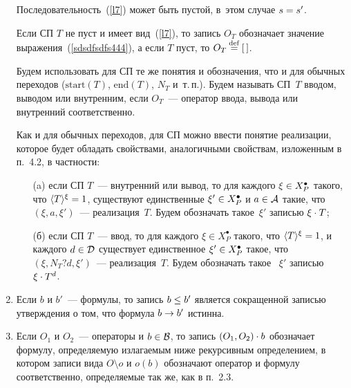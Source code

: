 \begin{multicols}{2}
\begin{enumerate}[1.]
Последовательность~(\ref{l7}) может быть пустой, в~этом случае $s\hm=s'$.

Если СП $T$ не пуст и имеет вид~(\ref{l7}), то
запись $O_T$ обозначает значение выражения~(\ref{sdsdfsdfs444}), а  если $T$ пуст,
то $O_T\mathbin{{\mathop{=}\limits^{\mathrm{def}}}} [\,]$.

Будем использовать для СП те же понятия и обозначения, что и для
обычных переходов ($\mathrm{start}\left(T\right)$,
$\mathrm{end}\left(T\right)$, $N_T$  и~т.\,п.). Будем
называть СП~$T$ вводом, выводом или внутренним, если $O_T$~---
оператор ввода, вывода или внутренний соответственно.

Как и для обычных переходов, для СП можно ввести понятие реализации,
которое будет обладать свойствами, аналогичными свойствам,
изложенным в п.~4.2, в частности:
\begin{itemize}
\item[(a)] если СП $T$~--- внутренний или вывод, то для каждого
$\xi\hm\in X_P^\bullet$ такого, что $\langle{T}\rangle^\xi\hm=1$, существуют единственные $\xi'\hm\in X_P^\bullet$ и
$a\hm\in {\cal A}$ такие, что  $(\xi, a, \xi')$~--- реализация~$T$.
Будем обозначать такое~$\xi'$  записью $\xi \cdot T$;
\item[(б)] если  СП $T$~--- ввод, то для каждого $\xi\in X_P^\bullet$
такого, что $\langle{T}\rangle^\xi \hm= 1$, и каждого $d\hm\in {\cal D}$ существует
единственное $\xi'\hm\in X_P^\bullet$ такое, что
 $(\xi, N_T?d, \xi')$~--- реализация~$T$. Будем обозначать такое~ $\xi'$
 записью $\xi \cdot T^d$.
\end{itemize}

\item Если $b$ и $b'$~--- формулы, то запись $b\hm\leq b'$
является сокращенной записью утверждения о том, что формула $b\hm\to b'$ истинна.

\item Если $O_1$ и $O_2$~--- операторы и $b\hm \in {\cal B}$, то
запись $(O_1,O_2) \cdot b$ обозначает формулу, определяемую
излагаемым ниже рекурсивным определением,
в котором записи вида $O\setminus o$ и $o(b)$ обозначают оператор
и формулу соответственно, определяемые так же, как в п.~2.3.


\end{enumerate}
\end{multicols}
